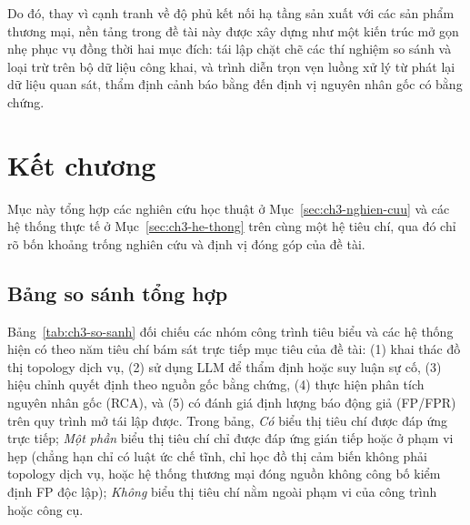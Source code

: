 Do đó, thay vì cạnh tranh về độ phủ kết nối hạ tầng sản xuất với các sản phẩm thương mại, nền tảng trong đề tài này được xây dựng như một kiến trúc mở gọn nhẹ phục vụ đồng thời hai mục đích: tái lập chặt chẽ các thí nghiệm so sánh và loại trừ trên bộ dữ liệu công khai, và trình diễn trọn vẹn luồng xử lý từ phát lại dữ liệu quan sát, thẩm định cảnh báo bằng \CTAV{} đến định vị nguyên nhân gốc có bằng chứng.

\section{Kết chương}
\label{sec:ch3-ket-chuong}

Mục này tổng hợp các nghiên cứu học thuật ở Mục~\ref{sec:ch3-nghien-cuu} và các hệ thống thực tế ở Mục~\ref{sec:ch3-he-thong} trên cùng một hệ tiêu chí, qua đó chỉ rõ bốn khoảng trống nghiên cứu và định vị đóng góp của đề tài.

\subsection{Bảng so sánh tổng hợp}
\label{sec:ch3-bang-so-sanh}

Bảng~\ref{tab:ch3-so-sanh} đối chiếu các nhóm công trình tiêu biểu và các hệ thống hiện có theo năm tiêu chí bám sát trực tiếp mục tiêu của đề tài: (1) khai thác đồ thị topology dịch vụ, (2) sử dụng LLM để thẩm định hoặc suy luận sự cố, (3) hiệu chỉnh quyết định theo nguồn gốc bằng chứng, (4) thực hiện phân tích nguyên nhân gốc (RCA), và (5) có đánh giá định lượng báo động giả (FP/FPR) trên quy trình mở tái lập được. Trong bảng, \emph{Có} biểu thị tiêu chí được đáp ứng trực tiếp; \emph{Một phần} biểu thị tiêu chí chỉ được đáp ứng gián tiếp hoặc ở phạm vi hẹp (chẳng hạn chỉ có luật ức chế tĩnh, chỉ học đồ thị cảm biến không phải topology dịch vụ, hoặc hệ thống thương mại đóng nguồn không công bố kiểm định FP độc lập); \emph{Không} biểu thị tiêu chí nằm ngoài phạm vi của công trình hoặc công cụ.

